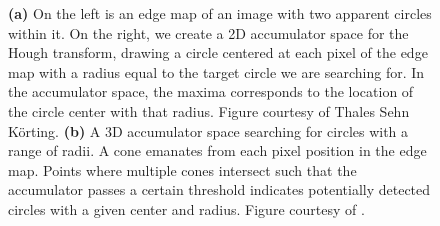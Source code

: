 \documentclass[11pt, letterpaper]{extarticle} %
\begin{document}
\begin{figure}[h]
    \centering
    \hfill
    \caption{\textbf{(a)} On the left is an edge map of an image with two apparent circles within it. On the right, we create a 2D accumulator space for the Hough transform, drawing a circle centered at each pixel of the edge map with a radius equal to the target circle we are searching for. In the accumulator space, the maxima corresponds to the location of the circle center with that radius. Figure courtesy of Thales Sehn Körting. \textbf{(b)} A 3D accumulator space searching for circles with a range of radii. A cone emanates from each pixel position in the edge map. Points where multiple cones intersect such that the accumulator passes a certain threshold indicates potentially detected circles with a given center and radius. Figure courtesy of \cite{djekoune2017incremental}.}
\end{figure}
\end{document}
